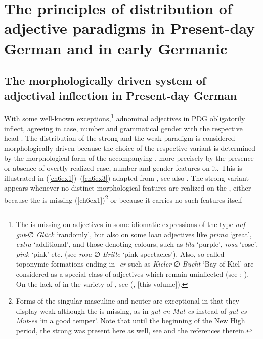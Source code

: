 \documentclass[output=paper,colorlinks,citecolor=brown]{langscibook}
\begin{document}
\section{The principles of distribution of adjective paradigms in Present-day German and in early Germanic}

\subsection{The morphologically driven system of adjectival inflection in Present-day German}\label{sec:morphdrivenPDG}
With some well-known exceptions,\footnote{The  is missing on
  adjectives in some idiomatic expressions of the type \emph{auf gut}-∅
  \emph{Glück} `randomly', but also on some loan adjectives like
  \emph{prima} `great', \emph{extra} `additional', and those denoting
  colours, such as \emph{lila} `purple', \emph{rosa} `rose', \emph{pink}
  `pink' etc. (see \emph{rosa}-∅ \emph{Brille} `pink spectacles'). Also,
  so-called toponymic formations ending in -\emph{er} such as
  \emph{Kieler}-∅ \emph{Bucht} `Bay of Kiel' are considered as a special
  class of adjectives which remain uninflected (see \citealp[347--349]{Duden16}; \citealp{Fuhrhop01}). On the lack of  in the  variety of , see \citeauthor{Rehn2019} (\citeyear{Rehn2019}, \citeyear{chapters/5Stacking} [this volume]).} adnominal adjectives in PDG obligatorily
inflect, agreeing in case, number and grammatical gender with the
respective head . The distribution of the strong and the weak
paradigm is considered morphologically driven because the choice of the
respective variant is determined by the morphological form of the
accompanying , more precisely by the presence or absence of
overtly realized case, number and gender features on it. This is
illustrated in (\ref{ch6ex1})--(\ref{ch6ex3}) adapted from \citet{Rehn2019}, see also \citet[369--370]{Duden16}. The strong  variant appears whenever no distinct
morphological features are realized on the , either because
the  is missing (\ref{ch6ex1})\footnote{Forms of the  singular
  masculine and neuter are exceptional in that they display weak
   although the  is missing, as in \emph{gut-en
  Mut-es} instead of \emph{gut-es Mut-es} `in a good temper'. Note that
  until the beginning of the New High  period, the strong
   was present here as well, see \citet[27--32]{Sahel2022} and the
  references therein.} or because it carries no such features itself
\end{document}
